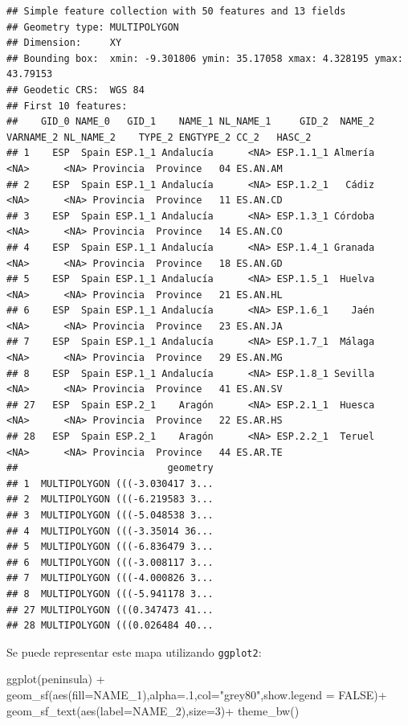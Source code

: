 \documentclass[
]{article}
\newenvironment{Shaded}{\begin{snugshade}}{\end{snugshade}}
\newcommand{\AttributeTok}[1]{\textcolor[rgb]{0.77,0.63,0.00}{#1}}
\newcommand{\ConstantTok}[1]{\textcolor[rgb]{0.00,0.00,0.00}{#1}}
\newcommand{\DecValTok}[1]{\textcolor[rgb]{0.00,0.00,0.81}{#1}}
\newcommand{\FunctionTok}[1]{\textcolor[rgb]{0.00,0.00,0.00}{#1}}
\newcommand{\NormalTok}[1]{#1}
\newcommand{\SpecialCharTok}[1]{\textcolor[rgb]{0.00,0.00,0.00}{#1}}
\newcommand{\StringTok}[1]{\textcolor[rgb]{0.31,0.60,0.02}{#1}}
\numberwithin{ejcnt}{section}
\begin{document}
\begin{verbatim}
## Simple feature collection with 50 features and 13 fields
## Geometry type: MULTIPOLYGON
## Dimension:     XY
## Bounding box:  xmin: -9.301806 ymin: 35.17058 xmax: 4.328195 ymax: 43.79153
## Geodetic CRS:  WGS 84
## First 10 features:
##    GID_0 NAME_0   GID_1    NAME_1 NL_NAME_1     GID_2  NAME_2 VARNAME_2 NL_NAME_2    TYPE_2 ENGTYPE_2 CC_2   HASC_2
## 1    ESP  Spain ESP.1_1 Andalucía      <NA> ESP.1.1_1 Almería      <NA>      <NA> Provincia  Province   04 ES.AN.AM
## 2    ESP  Spain ESP.1_1 Andalucía      <NA> ESP.1.2_1   Cádiz      <NA>      <NA> Provincia  Province   11 ES.AN.CD
## 3    ESP  Spain ESP.1_1 Andalucía      <NA> ESP.1.3_1 Córdoba      <NA>      <NA> Provincia  Province   14 ES.AN.CO
## 4    ESP  Spain ESP.1_1 Andalucía      <NA> ESP.1.4_1 Granada      <NA>      <NA> Provincia  Province   18 ES.AN.GD
## 5    ESP  Spain ESP.1_1 Andalucía      <NA> ESP.1.5_1  Huelva      <NA>      <NA> Provincia  Province   21 ES.AN.HL
## 6    ESP  Spain ESP.1_1 Andalucía      <NA> ESP.1.6_1    Jaén      <NA>      <NA> Provincia  Province   23 ES.AN.JA
## 7    ESP  Spain ESP.1_1 Andalucía      <NA> ESP.1.7_1  Málaga      <NA>      <NA> Provincia  Province   29 ES.AN.MG
## 8    ESP  Spain ESP.1_1 Andalucía      <NA> ESP.1.8_1 Sevilla      <NA>      <NA> Provincia  Province   41 ES.AN.SV
## 27   ESP  Spain ESP.2_1    Aragón      <NA> ESP.2.1_1  Huesca      <NA>      <NA> Provincia  Province   22 ES.AR.HS
## 28   ESP  Spain ESP.2_1    Aragón      <NA> ESP.2.2_1  Teruel      <NA>      <NA> Provincia  Province   44 ES.AR.TE
##                          geometry
## 1  MULTIPOLYGON (((-3.030417 3...
## 2  MULTIPOLYGON (((-6.219583 3...
## 3  MULTIPOLYGON (((-5.048538 3...
## 4  MULTIPOLYGON (((-3.35014 36...
## 5  MULTIPOLYGON (((-6.836479 3...
## 6  MULTIPOLYGON (((-3.008117 3...
## 7  MULTIPOLYGON (((-4.000826 3...
## 8  MULTIPOLYGON (((-5.941178 3...
## 27 MULTIPOLYGON (((0.347473 41...
## 28 MULTIPOLYGON (((0.026484 40...
\end{verbatim}

Se puede representar este mapa utilizando \texttt{ggplot2}:

\begin{Shaded}
\begin{Highlighting}[]
\FunctionTok{ggplot}\NormalTok{(peninsula) }\SpecialCharTok{+} 
    \FunctionTok{geom\_sf}\NormalTok{(}\FunctionTok{aes}\NormalTok{(}\AttributeTok{fill=}\NormalTok{NAME\_1),}\AttributeTok{alpha=}\NormalTok{.}\DecValTok{1}\NormalTok{,}\AttributeTok{col=}\StringTok{"grey80"}\NormalTok{,}\AttributeTok{show.legend =} \ConstantTok{FALSE}\NormalTok{)}\SpecialCharTok{+}
    \FunctionTok{geom\_sf\_text}\NormalTok{(}\FunctionTok{aes}\NormalTok{(}\AttributeTok{label=}\NormalTok{NAME\_2),}\AttributeTok{size=}\DecValTok{3}\NormalTok{)}\SpecialCharTok{+}
    \FunctionTok{theme\_bw}\NormalTok{()}
\end{Highlighting}
\end{Shaded}
\end{document}
